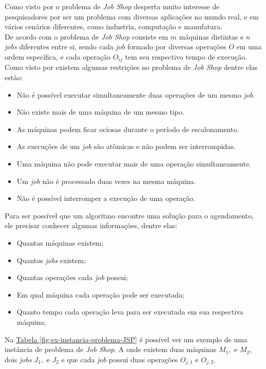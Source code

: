 Como visto por  o problema de \textit{Job Shop} desperta muito interesse de pesquisadores por ser um problema com diversas aplicações no mundo real, e em vários cenários diferentes, como industria, computação e manufatura.\\
%
\indent De acordo com \cite{Cheng1996} o problema de \textit{Job Shop} consiste em $m$ máquinas distintas e $n$ \textit{jobs} diferentes entre si, sendo cada \textit{job} formado por diversas operações $O$ em uma ordem específica, e cada operação $O_{ij}$ tem seu respectivo tempo de execução.\\
%
\indent Como visto por \cite{Bagchi1999} existem algumas restrições no problema de \textit{Job Shop} dentre elas estão:
\begin{itemize}
    \item Não é possível executar simultaneamente duas operações de um mesmo \textit{job}.
    \item Não existe mais de uma máquina de um mesmo tipo.
    \item As máquinas podem ficar ociosas durante o período de escalonamento.
    \item As execuções de um \textit{job} são atômicas e não podem ser interrompidas.
    \item Uma máquina não pode executar mais de uma operação simultaneamente.
    \item Um \textit{job} não é processado duas vezes na mesma máquina.
    \item Não é possível interromper a execução de uma operação.
\end{itemize}
\indent Para ser possível que um algoritmo encontre uma solução para o agendamento, ele precisar conhecer algumas informações, dentre elas: 
\begin{itemize}
    \item Quantas máquinas existem;
    \item Quantos \textit{jobs} existem;
    \item Quantas operações cada \textit{job} possui;
    \item Em qual máquina cada operação pode ser executada;
    \item Quanto tempo cada operação leva para ser executada em sua respectiva máquina;
\end{itemize}
Na 
\hyperref[fig:ex-instancia-problema-JSP]{Tabela \ref{fig:ex-instancia-problema-JSP}}
é possível ver um exemplo de uma instância de problema de \textit{Job Shop}. 
A onde existem duas máquinas $M_1, $ e $M_2$, 
dois \textit{jobs} $J_1, $ e $J_2$ 
e que cada \textit{job} possui 
duas operações $O_{j,1} $ e $O_{j,2}$.
    
